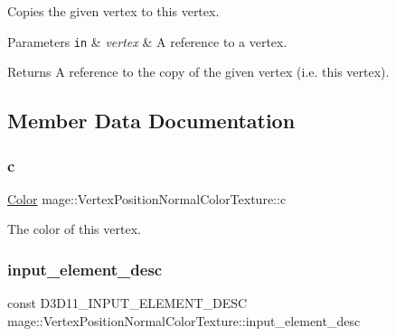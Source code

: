 Copies the given vertex to this vertex.


\begin{DoxyParams}[1]{Parameters}
\mbox{\tt in}  & {\em vertex} & A reference to a vertex. \\
\hline
\end{DoxyParams}
\begin{DoxyReturn}{Returns}
A reference to the copy of the given vertex (i.\+e. this vertex). 
\end{DoxyReturn}


\subsection{Member Data Documentation}
\hypertarget{structmage_1_1_vertex_position_normal_color_texture_a6b28cefeab374c3f38c44b49eea2ec78}{}\label{structmage_1_1_vertex_position_normal_color_texture_a6b28cefeab374c3f38c44b49eea2ec78} 
\subsubsection{\texorpdfstring{c}{c}}
{\footnotesize\ttfamily \hyperlink{structmage_1_1_color}{Color} mage\+::\+Vertex\+Position\+Normal\+Color\+Texture\+::c}

The color of this vertex. \hypertarget{structmage_1_1_vertex_position_normal_color_texture_af00c662c12d40c1fffe5df6896a95f82}{}\label{structmage_1_1_vertex_position_normal_color_texture_af00c662c12d40c1fffe5df6896a95f82} 
\subsubsection{\texorpdfstring{input\+\_\+element\+\_\+desc}{input\_element\_desc}}
{\footnotesize\ttfamily const D3\+D11\+\_\+\+I\+N\+P\+U\+T\+\_\+\+E\+L\+E\+M\+E\+N\+T\+\_\+\+D\+E\+SC mage\+::\+Vertex\+Position\+Normal\+Color\+Texture\+::input\+\_\+element\+\_\+desc\hspace{0.3cm}{\ttfamily [static]}}

